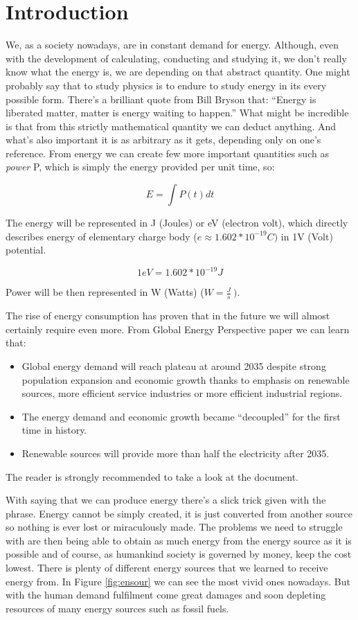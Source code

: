 \chapter{Introduction}
We, as a society nowadays, are in constant demand for energy. Although,
even with the development of calculating, conducting and studying it, we
don't really know what the energy is, we are depending on that abstract
quantity. One might probably say that to study physics is to endure to
study energy in its every possible form. There's a brilliant quote from
Bill Bryson that: ``Energy is liberated matter, matter is energy waiting
to happen.'' What might be incredible is that from this strictly
mathematical quantity we can deduct anything. And what's also important
it is as arbitrary as it gets, depending only on one's reference. From
energy we can create few more important quantities such as \emph{power}
P, which is simply the energy provided per unit time, so:

$$E = \int P\left( t \right)dt$$

\noindent The energy will be represented in J (Joules) or eV (electron
volt), which directly describes energy of elementary charge body
(\(e \approx 1.602*10^{- 19}C)\) in 1V (Volt) potential.

$$1eV = 1.602*10^{- 19}J$$

\noindent Power will be then represented in W (Watts) (\(W = \frac{J}{s}\ ).\)

\noindent The rise of energy consumption has proven that in the future we will
almost certainly require even more. From Global Energy Perspective paper 
\cite{Insights2019} we can learn that:

\begin{itemize}
\item Global energy demand will reach plateau at around 2035 despite strong population expansion and economic growth thanks to emphasis on renewable sources, more efficient service industries or more efficient industrial regions.
\item The energy demand and economic growth became ``decoupled'' for the first time in history.
\item Renewable sources will provide more than half the electricity after 2035.

\end{itemize}

\noindent The reader is strongly recommended to take a look at the document.

\noindent With saying that we can produce energy there's a slick trick given with
the phrase. Energy cannot be simply created, it is just converted from
another source so nothing is ever lost or miraculously made. The
problems we need to struggle with are then being able to obtain as much
energy from the energy source as it is possible and of course, as
humankind society is governed by money, keep the cost lowest. There is
plenty of different energy sources that we learned to receive energy
from. In Figure \ref{fig:ensour} we can see the most vivid ones nowadays. But with
the human demand fulfilment come great damages and soon depleting
resources of many energy sources such as fossil fuels.


